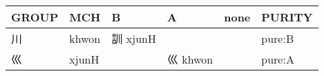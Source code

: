 \documentclass[14pt,a4paper]{scrartcl}
\begin{document}
\begin{longtable}[c]{@{}llllll@{}}
\toprule
\begin{minipage}[b]{0.14\columnwidth}\raggedright\strut
GROUP
\strut\end{minipage} &
\begin{minipage}[b]{0.14\columnwidth}\raggedright\strut
MCH
\strut\end{minipage} &
\begin{minipage}[b]{0.14\columnwidth}\raggedright\strut
B
\strut\end{minipage} &
\begin{minipage}[b]{0.14\columnwidth}\raggedright\strut
A
\strut\end{minipage} &
\begin{minipage}[b]{0.14\columnwidth}\raggedright\strut
none
\strut\end{minipage} &
\begin{minipage}[b]{0.14\columnwidth}\raggedright\strut
PURITY
\strut\end{minipage}\tabularnewline
\midrule
\endhead
\begin{minipage}[t]{0.14\columnwidth}\raggedright\strut
川
\strut\end{minipage} &
\begin{minipage}[t]{0.14\columnwidth}\raggedright\strut
khwon
\strut\end{minipage} &
\begin{minipage}[t]{0.14\columnwidth}\raggedright\strut
訓 xjunH
\strut\end{minipage} &
\begin{minipage}[t]{0.14\columnwidth}\raggedright\strut
\strut\end{minipage} &
\begin{minipage}[t]{0.14\columnwidth}\raggedright\strut
\strut\end{minipage} &
\begin{minipage}[t]{0.14\columnwidth}\raggedright\strut
pure:B
\strut\end{minipage}\tabularnewline
\begin{minipage}[t]{0.14\columnwidth}\raggedright\strut
巛
\strut\end{minipage} &
\begin{minipage}[t]{0.14\columnwidth}\raggedright\strut
xjunH
\strut\end{minipage} &
\begin{minipage}[t]{0.14\columnwidth}\raggedright\strut
\strut\end{minipage} &
\begin{minipage}[t]{0.14\columnwidth}\raggedright\strut
巛 khwon
\strut\end{minipage} &
\begin{minipage}[t]{0.14\columnwidth}\raggedright\strut
\strut\end{minipage} &
\begin{minipage}[t]{0.14\columnwidth}\raggedright\strut
pure:A
\strut\end{minipage}\tabularnewline
\bottomrule
\end{longtable}
\end{document}
